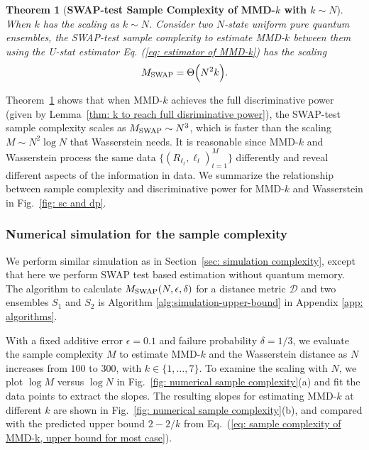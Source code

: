 \documentclass[aps,prx,reprint,superscriptaddress,amsmath,amssymb,longbibliography,floatfix]{revtex4-2}
\newcommand{\scD}{\mathcal{D}}
\theoremstyle{plain}
\newtheorem{theorem}{Theorem}[section]
\theoremstyle{definition}
\theoremstyle{remark}
\begin{document}
\begin{theorem}[\textbf{SWAP-test Sample Complexity of MMD-$k$ with $k\sim N$}]
    When $k$ has the scaling as $k\sim N$.
    Consider two $N$-state uniform pure quantum ensembles, the SWAP-test sample complexity to estimate MMD-$k$ between them using the U-stat estimator Eq. (\ref{eq: estimator of MMD-k}) has the scaling
    \begin{equation}
        M_{\rm SWAP} = \Theta\Big(N^2k\Big).
    \end{equation}
        \label{thm: sample complexity of MMD-k, k large}
\end{theorem}
Theorem~\ref{thm: sample complexity of MMD-k, k large} shows that when MMD-$k$ achieves the full discriminative power (given by Lemma~\ref{thm: k to reach full disriminative power}), the SWAP-test sample complexity scales as $M_{\rm SWAP}\sim N^3$, which is faster than the scaling $M\sim N^2 \log N$ that Wasserstein needs. It is reasonable since MMD-$k$ and Wasserstein process the same data $\{(R_{\ell_t},\ell_t)_{t=1}^M\}$ differently and reveal different aspects of the information in data. We summarize the relationship between sample complexity and discriminative power for MMD-$k$ and Wasserstein in Fig.~\ref{fig: sc and dp}.



\subsubsection{Numerical simulation for the sample complexity}

We perform similar simulation as in Section~\ref{sec: simulation complexity}, except that here we perform SWAP test based estimation without quantum memory. The algorithm to calculate $M_{\rm SWAP}(N,\epsilon,\delta)$ for a distance metric $\scD$ and two ensembles $S_1$ and $S_2$ is Algorithm \ref{alg:simulation-upper-bound} in Appendix \ref{app: algorithms}.

With a fixed additive error $\epsilon=0.1$ and failure probability $\delta=1/3$, we evaluate the sample complexity $M$ to estimate MMD-$k$ and the Wasserstein distance as $N$ increases from $100$ to $300$, with $k \in \{1,\ldots,7\}$. To examine the scaling with $N$, we plot $\log M$ versus $\log N$ in Fig.~\ref{fig: numerical sample complexity}(a) and fit the data points to extract the slopes. The resulting slopes for estimating MMD-$k$ at different $k$ are shown in Fig.~\ref{fig: numerical sample complexity}(b), and compared with the predicted upper bound $2-2/k$ from Eq.~(\ref{eq: sample complexity of MMD-k, upper bound for most case}).
\end{document}
